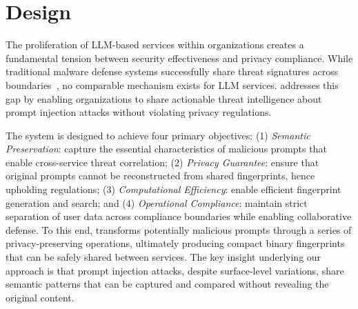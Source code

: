 
\section{\tool Design}
\label{sec:design}



The proliferation of LLM-based services within organizations creates a fundamental tension between security effectiveness and privacy compliance.
While traditional malware defense systems successfully share threat signatures across boundaries~\cite{li2019reading}, no comparable mechanism exists for LLM services.
\tool addresses this gap by enabling organizations to share actionable threat intelligence about prompt injection attacks without violating privacy regulations. 

The system is designed to achieve four primary objectives: 
(1) \emph{Semantic Preservation}: capture the essential characteristics of malicious prompts that enable cross-service threat correlation; 
(2) \emph{Privacy Guarantee}: ensure that original prompts cannot be reconstructed from shared fingerprints, hence upholding regulations; 
(3) \emph{Computational Efficiency}: enable efficient fingerprint generation and search; and (4) \emph{Operational Compliance}: maintain strict separation of user data across compliance boundaries while enabling collaborative defense.
To this end, \tool transforms potentially malicious prompts through a series of privacy-preserving operations, ultimately producing compact binary fingerprints that can be safely shared between services.
The key insight underlying our approach is that prompt injection attacks, despite surface-level variations, share semantic patterns that can be captured and compared without revealing the original content.
%
%

